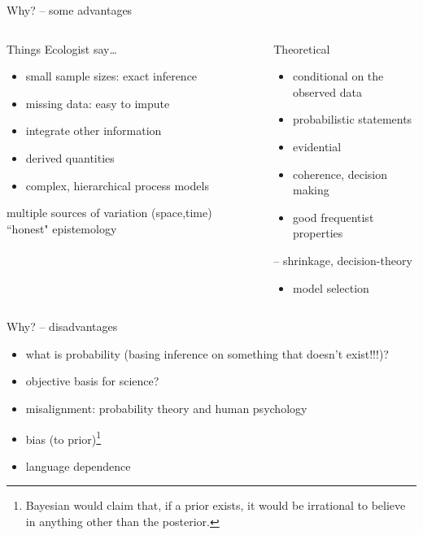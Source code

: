 \documentclass[presentation,9pt,xcolor=dvipsnames]{beamer}
\begin{document}
\begin{frame}[label={sec:org09cfbcc}]{Why? -- some advantages}
\begin{columns}
\begin{column}{0.55\columnwidth}
\begin{block}{Things Ecologist say\ldots{}}
\begin{itemize}
\item small sample sizes: exact inference
\item missing data: easy to impute
\item integrate other information
\item derived quantities
\item complex, hierarchical process models
\end{itemize}
multiple sources of variation (space,time)
``honest" epistemology
\end{block}
\end{column}
\begin{column}{0.45\columnwidth}
\begin{block}{Theoretical}
\begin{itemize}
\item conditional on the observed data
\item probabilistic statements
\item evidential
\item coherence, decision making
\item good frequentist properties
\end{itemize}
-- shrinkage, decision-theory
\begin{itemize}
\item model selection
\end{itemize}
\end{block}
\end{column}
\end{columns}
\end{frame}
\begin{frame}[label={sec:org2490bdd}]{Why? -- disadvantages}
\begin{itemize}
\item what is probability (basing inference on something that doesn't exist!!!)?
\item objective basis for science?
\item misalignment: probability theory and human psychology
\item bias (to prior)\footnote{Bayesian would claim that, if a prior exists, it would be irrational to believe in anything other than the posterior.}
\item language dependence
\end{itemize}
\end{frame}
\end{document}
